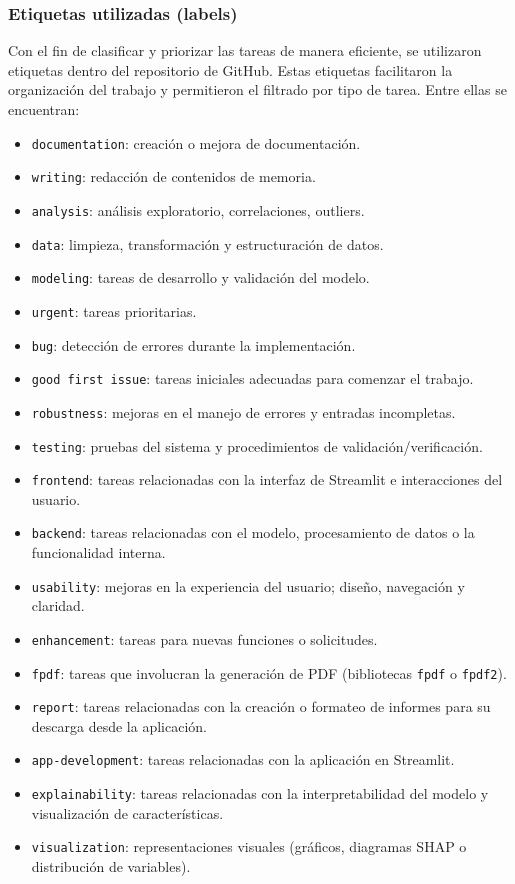\subsubsection{Etiquetas utilizadas (labels)}

Con el fin de clasificar y priorizar las tareas de manera eficiente, se utilizaron etiquetas dentro del repositorio de GitHub. Estas etiquetas facilitaron la organización del trabajo y permitieron el filtrado por tipo de tarea. Entre ellas se encuentran:

\begin{itemize}
  \item \texttt{documentation}: creación o mejora de documentación.
  \item \texttt{writing}: redacción de contenidos de memoria.
  \item \texttt{analysis}: análisis exploratorio, correlaciones, outliers.
  \item \texttt{data}: limpieza, transformación y estructuración de datos.
  \item \texttt{modeling}: tareas de desarrollo y validación del modelo.
  \item \texttt{urgent}: tareas prioritarias.
  \item \texttt{bug}: detección de errores durante la implementación.
  \item \texttt{good first issue}: tareas iniciales adecuadas para comenzar el trabajo.
  \item \texttt{robustness}: mejoras en el manejo de errores y entradas incompletas.
  \item \texttt{testing}: pruebas del sistema y procedimientos de validación/verificación.
  \item \texttt{frontend}: tareas relacionadas con la interfaz de Streamlit e interacciones del usuario.
  \item \texttt{backend}: tareas relacionadas con el modelo, procesamiento de datos o la funcionalidad interna.
  \item \texttt{usability}: mejoras en la experiencia del usuario; diseño, navegación y claridad.
  \item \texttt{enhancement}: tareas para nuevas funciones o solicitudes.
  \item \texttt{fpdf}: tareas que involucran la generación de PDF (bibliotecas \texttt{fpdf} o \texttt{fpdf2}).
  \item \texttt{report}: tareas relacionadas con la creación o formateo de informes para su descarga desde la aplicación.
  \item \texttt{app-development}: tareas relacionadas con la aplicación en Streamlit.
  \item \texttt{explainability}: tareas relacionadas con la interpretabilidad del modelo y visualización de características.
  \item \texttt{visualization}: representaciones visuales (gráficos, diagramas SHAP o distribución de variables).
\end{itemize}


